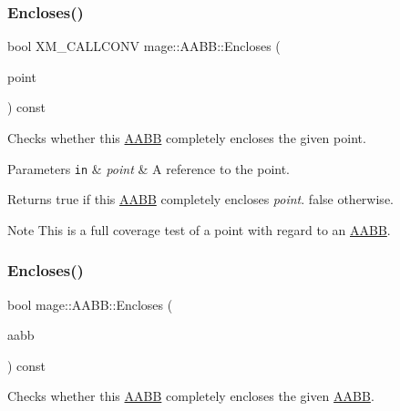 \subsubsection{\texorpdfstring{Encloses()}{Encloses()}\hspace{0.1cm}{\footnotesize\ttfamily [2/4]}}
{\footnotesize\ttfamily bool X\+M\+\_\+\+C\+A\+L\+L\+C\+O\+NV mage\+::\+A\+A\+B\+B\+::\+Encloses (\begin{DoxyParamCaption}\item[{F\+X\+M\+V\+E\+C\+T\+OR}]{point }\end{DoxyParamCaption}) const\hspace{0.3cm}{\ttfamily [noexcept]}}

Checks whether this \hyperlink{classmage_1_1_a_a_b_b}{A\+A\+BB} completely encloses the given point.


\begin{DoxyParams}[1]{Parameters}
\mbox{\tt in}  & {\em point} & A reference to the point. \\
\hline
\end{DoxyParams}
\begin{DoxyReturn}{Returns}
{\ttfamily true} if this \hyperlink{classmage_1_1_a_a_b_b}{A\+A\+BB} completely encloses {\itshape point}. {\ttfamily false} otherwise. 
\end{DoxyReturn}
\begin{DoxyNote}{Note}
This is a full coverage test of a point with regard to an \hyperlink{classmage_1_1_a_a_b_b}{A\+A\+BB}. 
\end{DoxyNote}
\hypertarget{classmage_1_1_a_a_b_b_a06f017756a593461127613e4d77d0944}{}\label{classmage_1_1_a_a_b_b_a06f017756a593461127613e4d77d0944} 
\subsubsection{\texorpdfstring{Encloses()}{Encloses()}\hspace{0.1cm}{\footnotesize\ttfamily [3/4]}}
{\footnotesize\ttfamily bool mage\+::\+A\+A\+B\+B\+::\+Encloses (\begin{DoxyParamCaption}\item[{const \hyperlink{classmage_1_1_a_a_b_b}{A\+A\+BB} \&}]{aabb }\end{DoxyParamCaption}) const\hspace{0.3cm}{\ttfamily [noexcept]}}

Checks whether this \hyperlink{classmage_1_1_a_a_b_b}{A\+A\+BB} completely encloses the given \hyperlink{classmage_1_1_a_a_b_b}{A\+A\+BB}.


